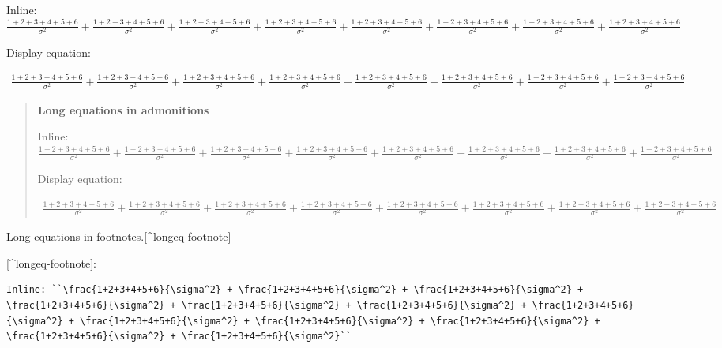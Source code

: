 \begin{adjustwidth}{2em}{0pt}

Inline: \(\frac{1+2+3+4+5+6}{\sigma^2} + \frac{1+2+3+4+5+6}{\sigma^2} + \frac{1+2+3+4+5+6}{\sigma^2} + \frac{1+2+3+4+5+6}{\sigma^2} + \frac{1+2+3+4+5+6}{\sigma^2} + \frac{1+2+3+4+5+6}{\sigma^2} + \frac{1+2+3+4+5+6}{\sigma^2} + \frac{1+2+3+4+5+6}{\sigma^2}\)

Display equation:

\begin{equation*}
\begin{split}\frac{1+2+3+4+5+6}{\sigma^2} + \frac{1+2+3+4+5+6}{\sigma^2} + \frac{1+2+3+4+5+6}{\sigma^2} + \frac{1+2+3+4+5+6}{\sigma^2} + \frac{1+2+3+4+5+6}{\sigma^2} + \frac{1+2+3+4+5+6}{\sigma^2} + \frac{1+2+3+4+5+6}{\sigma^2} + \frac{1+2+3+4+5+6}{\sigma^2}\end{split}\end{equation*}
\begin{quote}
\textbf{Long equations in admonitions}

Inline: \(\frac{1+2+3+4+5+6}{\sigma^2} + \frac{1+2+3+4+5+6}{\sigma^2} + \frac{1+2+3+4+5+6}{\sigma^2} + \frac{1+2+3+4+5+6}{\sigma^2} + \frac{1+2+3+4+5+6}{\sigma^2} + \frac{1+2+3+4+5+6}{\sigma^2} + \frac{1+2+3+4+5+6}{\sigma^2} + \frac{1+2+3+4+5+6}{\sigma^2}\)

Display equation:

\begin{equation*}
\begin{split}\frac{1+2+3+4+5+6}{\sigma^2} + \frac{1+2+3+4+5+6}{\sigma^2} + \frac{1+2+3+4+5+6}{\sigma^2} + \frac{1+2+3+4+5+6}{\sigma^2} + \frac{1+2+3+4+5+6}{\sigma^2} + \frac{1+2+3+4+5+6}{\sigma^2} + \frac{1+2+3+4+5+6}{\sigma^2} + \frac{1+2+3+4+5+6}{\sigma^2}\end{split}\end{equation*}
\end{quote}
Long equations in footnotes.[{\textasciicircum}longeq-footnote]

[{\textasciicircum}longeq-footnote]:


\begin{lstlisting}
Inline: ``\frac{1+2+3+4+5+6}{\sigma^2} + \frac{1+2+3+4+5+6}{\sigma^2} + \frac{1+2+3+4+5+6}{\sigma^2} + \frac{1+2+3+4+5+6}{\sigma^2} + \frac{1+2+3+4+5+6}{\sigma^2} + \frac{1+2+3+4+5+6}{\sigma^2} + \frac{1+2+3+4+5+6}{\sigma^2} + \frac{1+2+3+4+5+6}{\sigma^2} + \frac{1+2+3+4+5+6}{\sigma^2} + \frac{1+2+3+4+5+6}{\sigma^2} + \frac{1+2+3+4+5+6}{\sigma^2} + \frac{1+2+3+4+5+6}{\sigma^2}``


\end{lstlisting}
\end{adjustwidth}
